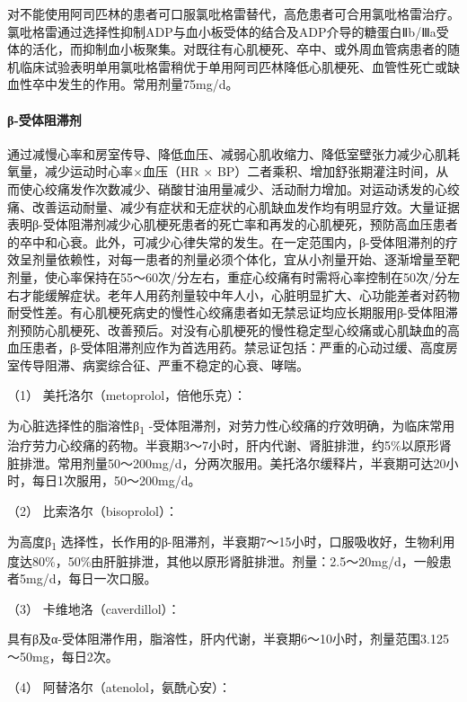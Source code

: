 对不能使用阿司匹林的患者可口服氯吡格雷替代，高危患者可合用氯吡格雷治疗。氯吡格雷通过选择性抑制ADP与血小板受体的结合及ADP介导的糖蛋白Ⅱb/Ⅲa受体的活化，而抑制血小板聚集。对既往有心肌梗死、卒中、或外周血管病患者的随机临床试验表明单用氯吡格雷稍优于单用阿司匹林降低心肌梗死、血管性死亡或缺血性卒中发生的作用。常用剂量75mg/d。

\paragraph{β-受体阻滞剂}

通过减慢心率和房室传导、降低血压、减弱心肌收缩力、降低室壁张力减少心肌耗氧量，减少运动时心率×血压（HR
×
BP）二者乘积、增加舒张期灌注时间，从而使心绞痛发作次数减少、硝酸甘油用量减少、活动耐力增加。对运动诱发的心绞痛、改善运动耐量、减少有症状和无症状的心肌缺血发作均有明显疗效。大量证据表明β-受体阻滞剂减少心肌梗死患者的死亡率和再发的心肌梗死，预防高血压患者的卒中和心衰。此外，可减少心律失常的发生。在一定范围内，β-受体阻滞剂的疗效呈剂量依赖性，对每一患者的剂量必须个体化，宜从小剂量开始、逐渐增量至靶剂量，使心率保持在55～60次/分左右，重症心绞痛有时需将心率控制在50次/分左右才能缓解症状。老年人用药剂量较中年人小，心脏明显扩大、心功能差者对药物耐受性差。有心肌梗死病史的慢性心绞痛患者如无禁忌证均应长期服用β-受体阻滞剂预防心肌梗死、改善预后。对没有心肌梗死的慢性稳定型心绞痛或心肌缺血的高血压患者，β-受体阻滞剂应作为首选用药。禁忌证包括：严重的心动过缓、高度房室传导阻滞、病窦综合征、严重不稳定的心衰、哮喘。

\hypertarget{text00309.htmlux5cux23CHP10-7-3-1-2-2-1}{}
（1） 美托洛尔（metoprolol，倍他乐克）：

为心脏选择性的脂溶性β\textsubscript{1}
-受体阻滞剂，对劳力性心绞痛的疗效明确，为临床常用治疗劳力心绞痛的药物。半衰期3～7小时，肝内代谢、肾脏排泄，约5\%以原形肾脏排泄。常用剂量50～200mg/d，分两次服用。美托洛尔缓释片，半衰期可达20小时，每日1次服用，50～200mg/d。

\hypertarget{text00309.htmlux5cux23CHP10-7-3-1-2-2-2}{}
（2） 比索洛尔（bisoprolol）：

为高度β\textsubscript{1}
选择性，长作用的β-阻滞剂，半衰期7～15小时，口服吸收好，生物利用度达80\%，50\%由肝脏排泄，其他以原形肾脏排泄。剂量：2.5～20mg/d，一般患者5mg/d，每日一次口服。

\hypertarget{text00309.htmlux5cux23CHP10-7-3-1-2-2-3}{}
（3） 卡维地洛（caverdillol）：

具有β及α-受体阻滞作用，脂溶性，肝内代谢，半衰期6～10小时，剂量范围3.125～50mg，每日2次。

\hypertarget{text00309.htmlux5cux23CHP10-7-3-1-2-2-4}{}
（4） 阿替洛尔（atenolol，氨酰心安）：

